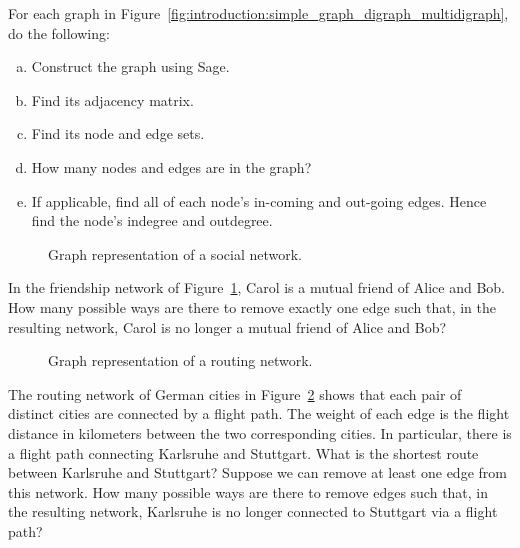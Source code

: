 \begin{problem}
\item For each graph in
  Figure~\ref{fig:introduction:simple_graph_digraph_multidigraph}, do
  the following:
  \begin{enumerate}[(a)]
  \item Construct the graph using Sage.

  \item Find its adjacency matrix.

  \item Find its node and edge sets.

  \item How many nodes and edges are in the graph?

  \item If applicable, find all of each node's in-coming and out-going
    edges. Hence find the node's indegree and outdegree.
  \end{enumerate}

  \begin{figure}[!htbp]
    \centering
    
    \caption{Graph representation of a social network.}
    \label{fig:introduction:social_network}
  \end{figure}

\item In the friendship network of
  Figure~\ref{fig:introduction:social_network}, Carol is a mutual
  friend of Alice and Bob. How many possible ways are there to remove
  exactly one edge such that, in the resulting network, Carol is no
  longer a mutual friend of Alice and Bob?

  \begin{figure}[!htbp]
    \centering
    
    \caption{Graph representation of a routing network.}
    \label{fig:introduction:routing_network}
  \end{figure}

\item The routing network of German cities in
  Figure~\ref{fig:introduction:routing_network} shows that each pair
  of distinct cities are connected by a flight path. The weight of
  each edge is the flight distance in kilometers between the two
  corresponding cities. In particular, there is a flight path
  connecting Karlsruhe and Stuttgart. What is the shortest route
  between Karlsruhe and Stuttgart? Suppose we can remove at least one
  edge from this network. How many possible ways are there to remove
  edges such that, in the resulting network, Karlsruhe is no longer
  connected to Stuttgart via a flight path?


\end{problem}
